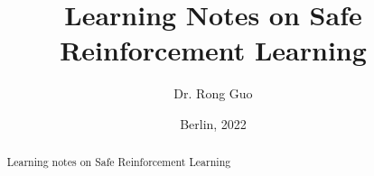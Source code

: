 \titlehead{\centering Technische Universität Berlin | Fakultät IV | Neuronale Informationsverarbeitung}
\title{\Large Learning Notes on Safe Reinforcement Learning}
\author{Dr. Rong Guo}
\date{Berlin, 2022}
\publishers{}

\maketitle

\begin{abstract}
	\noindent
Learning notes on Safe Reinforcement Learning
\end{abstract}

\setcounter{tocdepth}{3}
\setcounter{secnumdepth}{3}
\tableofcontents{}

\clearpage
